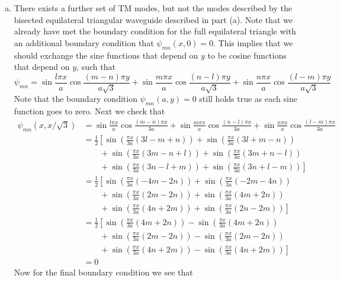 \documentclass[11pt]{article}
\numberwithin{equation}{section}
\begin{document}
\begin{enumerate}[(a)]
\item
    There exists a further set of TM modes, but not the modes described by the bisected 
    equilateral triangular waveguide described in part (a). Note that we already have met the
    boundary condition for the full equilateral triangle with an additional boundary 
    condition that $\psi_{mn}(x,0) = 0$. This implies that we should exchange the sine functions that depend on $y$
    to be cosine functions that depend on $y$, such that
    $$\psi_{mn} = \sin\frac{l\pi{x}}{a}\cos\frac{(m-n)\pi{y}}{a\sqrt{3}} + \sin\frac{m\pi{x}}{a}\cos\frac{(n-l)\pi{y}}{a\sqrt{3}} + \sin\frac{n\pi{x}}{a}\cos\frac{(l-m)\pi{y}}{a\sqrt{3}}$$
    Note that the boundary condition $\psi_{mn}(a,y) = 0$ still holds true as each sine function goes to zero. Next
    we check that
    \begin{align*}
        \psi_{mn}(x,x/\sqrt{3}) &= \sin\frac{l\pi{x}}{a}\cos\frac{(m-n)\pi{x}}{3a}
            + \sin\frac{m\pi{x}}{a}\cos\frac{(n-l)\pi{x}}{3a}
            + \sin\frac{n\pi{x}}{a}\cos\frac{(l-m)\pi{x}}{3a}\\
        &= \frac{1}{2}\left[\sin\left(\frac{\pi{x}}{3a}(3l-m+n)\right) + \sin\left(\frac{\pi{x}}{3a}(3l+m-n)\right)\right.\\
        &\qquad+\sin\left(\frac{\pi{x}}{3a}(3m-n+l)\right) + \sin\left(\frac{\pi{x}}{3a}(3m+n-l)\right)\\
        &\qquad+\left.\sin\left(\frac{\pi{x}}{3a}(3n-l+m)\right) + \sin\left(\frac{\pi{x}}{3a}(3n+l-m)\right)\right]\\
        &= \frac{1}{2}\left[\sin\left(\frac{\pi{x}}{3a}(-4m-2n)\right) + \sin\left(\frac{\pi{x}}{3a}(-2m-4n)\right)\right.\\
        &\qquad+\sin\left(\frac{\pi{x}}{3a}(2m-2n)\right) + \sin\left(\frac{\pi{x}}{3a}(4m+2n)\right)\\
        &\qquad+\left.\sin\left(\frac{\pi{x}}{3a}(4n+2m)\right) + \sin\left(\frac{\pi{x}}{3a}(2n-2m)\right)\right]\\
        &= \frac{1}{2}\left[\sin\left(\frac{\pi{x}}{3a}(4m+2n)\right) - \sin\left(\frac{\pi{x}}{3a}(4m+2n)\right)\right.\\
        &\qquad+\sin\left(\frac{\pi{x}}{3a}(2m-2n)\right) - \sin\left(\frac{\pi{x}}{3a}(2m-2n)\right)\\
        &\qquad+\left.\sin\left(\frac{\pi{x}}{3a}(4n+2m)\right) - \sin\left(\frac{\pi{x}}{3a}(4n+2m)\right)\right]\\
        &= 0
    \end{align*}
    Now for the final boundary condition we see that

\end{enumerate}
\end{document}
